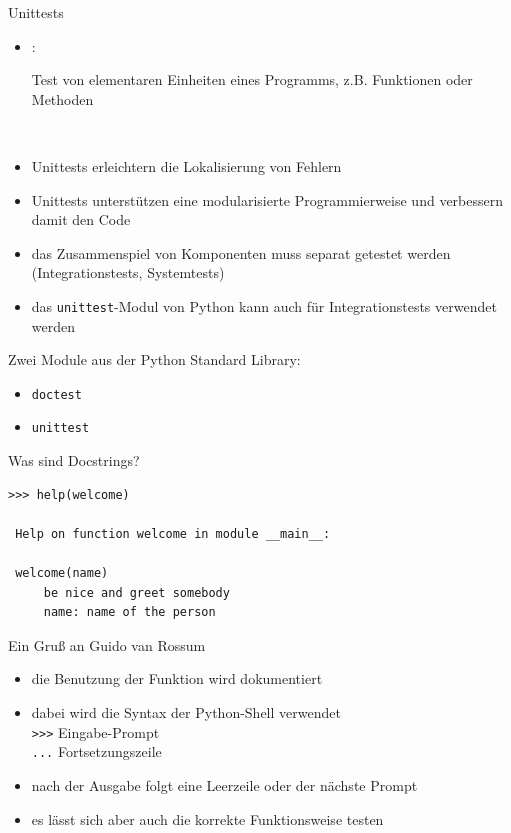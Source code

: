 \documentclass[t, utf8x, 10pt]{beamer}
\begin{document}
\begin{frame}[c]{Unittests}
 \begin{itemize}
  \item {}: \parbox[t]{0.78\textwidth}{Test von elementaren Einheiten
	  eines Programms, z.B. Funktionen oder Methoden}\\[0.2truecm]
  \item Unittests erleichtern die Lokalisierung von Fehlern
  \item Unittests unterstützen eine modularisierte Programmierweise und verbessern
	damit den Code
  \item das Zusammenspiel von Komponenten muss separat getestet werden (Integrationstests,
	Systemtests)
  \item das \texttt{unittest}-Modul von Python kann auch für Integrationstests verwendet
	werden
 \end{itemize}
\end{frame}


\begin{frame}[c]
 \begin{Large}
  Zwei Module aus der Python Standard Library:
  \begin{itemize}
   \item<1-2> \texttt{doctest}
   \item<1>   \texttt{unittest}
  \end{itemize}
 \end{Large}
\end{frame}


\begin{frame}[fragile]{Was sind Docstrings?}
 

 \hrulefill

 \begin{lstlisting}[language={}]
 >>> help(welcome)

 Help on function welcome in module __main__:

 welcome(name)
     be nice and greet somebody
     name: name of the person
 \end{lstlisting}
\end{frame}


\begin{frame}{Ein Gruß an Guido van Rossum}
 

 \hrulefill
 \begin{itemize}
  \item die Benutzung der Funktion wird dokumentiert
  \item dabei wird die Syntax der Python-Shell verwendet\\
	\texttt{{>}{>}{>}} \quad Eingabe-Prompt\\
	\texttt{...} \quad Fortsetzungszeile
  \item nach der Ausgabe folgt eine Leerzeile oder der nächste Prompt
  \item \alert{es lässt sich aber auch die korrekte Funktionsweise testen}
 \end{itemize}
\end{frame}
\end{document}
